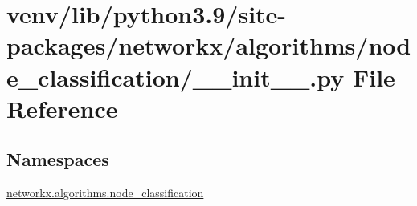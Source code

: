 \hypertarget{venv_2lib_2python3_89_2site-packages_2networkx_2algorithms_2node__classification_2____init_____8py}{}\section{venv/lib/python3.9/site-\/packages/networkx/algorithms/node\+\_\+classification/\+\_\+\+\_\+init\+\_\+\+\_\+.py File Reference}
\label{venv_2lib_2python3_89_2site-packages_2networkx_2algorithms_2node__classification_2____init_____8py}
\subsection*{Namespaces}
\begin{DoxyCompactItemize}
\item 
 \hyperlink{namespacenetworkx_1_1algorithms_1_1node__classification}{networkx.\+algorithms.\+node\+\_\+classification}
\end{DoxyCompactItemize}

